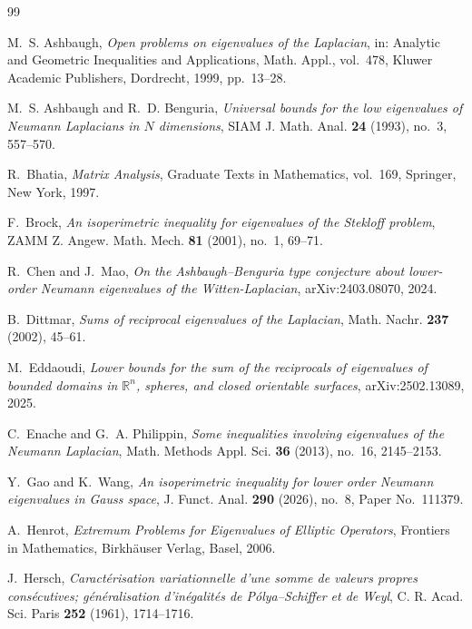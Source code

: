 \documentclass[11pt,letterpaper,reqno]{amsart}
\theoremstyle{definition}
\begin{document}
\begin{thebibliography}{99}

M.~S. Ashbaugh, \emph{Open problems on eigenvalues of the Laplacian}, in: Analytic and Geometric Inequalities and Applications, Math. Appl., vol.~478, Kluwer Academic Publishers, Dordrecht, 1999, pp.~13--28.

M.~S. Ashbaugh and R.~D. Benguria, \emph{Universal bounds for the low eigenvalues of Neumann Laplacians in $N$ dimensions}, SIAM J. Math. Anal. \textbf{24} (1993), no.~3, 557--570.

R.~Bhatia,
\emph{Matrix Analysis},
Graduate Texts in Mathematics, vol.~169,
Springer, New York, 1997.

 F.~Brock, \emph{An isoperimetric inequality for eigenvalues of the Stekloff problem}, ZAMM Z. Angew. Math. Mech. \textbf{81} (2001), no.~1, 69--71.


R.~Chen and J.~Mao,
\emph{On the Ashbaugh--Benguria type conjecture about lower-order Neumann eigenvalues of the Witten-Laplacian},
arXiv:2403.08070, 2024.



B.~Dittmar,
\emph{Sums of reciprocal eigenvalues of the Laplacian},
Math. Nachr. \textbf{237} (2002), 45--61.



M.~Eddaoudi, \emph{Lower bounds for the sum of the reciprocals of eigenvalues of bounded domains in \(\mathbb R^n\), spheres, and closed orientable surfaces}, arXiv:2502.13089, 2025.



C.~Enache and G.~A. Philippin,
\emph{Some inequalities involving eigenvalues of the Neumann Laplacian},
Math. Methods Appl. Sci. \textbf{36} (2013), no.~16, 2145--2153.


Y.~Gao and K.~Wang,
\emph{An isoperimetric inequality for lower order Neumann eigenvalues in Gauss space},
J. Funct. Anal. \textbf{290} (2026), no.~8, Paper No.~111379.


A.~Henrot,
\emph{Extremum Problems for Eigenvalues of Elliptic Operators},
Frontiers in Mathematics,
Birkh\"auser Verlag, Basel, 2006.


J.~Hersch, \emph{Caract\'erisation variationnelle d'une somme de valeurs propres cons\'ecutives; g\'en\'eralisation d'in\'egalit\'es de P\'olya--Schiffer et de Weyl}, C. R. Acad. Sci. Paris \textbf{252} (1961), 1714--1716.


\end{thebibliography}
\end{document}
